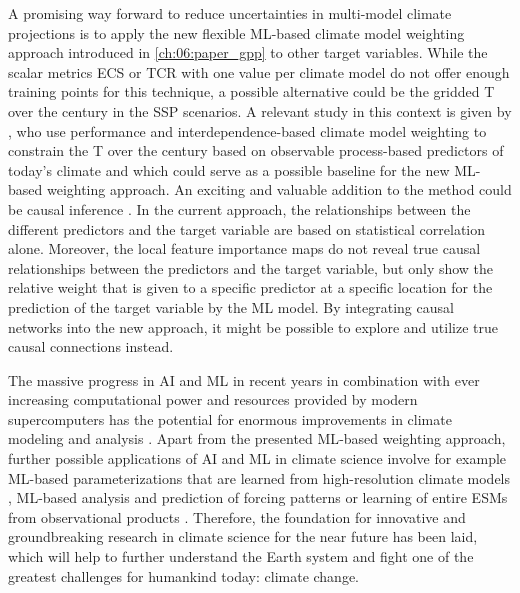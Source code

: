 A promising way forward to reduce uncertainties in multi-model climate
projections is to apply the new flexible \ac{ML}-based climate model weighting
approach introduced in \cref{ch:06:paper_gpp} to other target variables. While
the scalar metrics \ac{ECS} or \ac{TCR} with one value per climate model do not
offer enough training points for this technique, a possible alternative could
be the gridded \acl{T} over the  century in the \ac{SSP} scenarios. A
relevant study in this context is given by \textcite{Brunner2020}, who use
performance and interdependence-based climate model weighting to constrain the
\acl{T} over the  century based on observable process-based predictors
of today's climate and which could serve as a possible baseline for the new
\ac{ML}-based weighting approach. An exciting and valuable addition to the
method could be causal inference \autocite{Nowack2020, Runge2019}. In the
current approach, the relationships between the different predictors and the
target variable are based on statistical correlation alone. Moreover, the local
feature importance maps do not reveal true causal relationships between the
predictors and the target variable, but only show the relative weight that is
given to a specific predictor at a specific location for the prediction of the
target variable by the \ac{ML} model. By integrating causal networks into the
new approach, it might be possible to explore and utilize true causal
connections instead.

The massive progress in \ac{AI} and \ac{ML} in recent years in combination with
ever increasing computational power and resources provided by modern
supercomputers has the potential for enormous improvements in climate modeling
and analysis \autocite{Reichstein2019}. Apart from the presented \ac{ML}-based
weighting approach, further possible applications of \ac{AI} and \ac{ML} in
climate science involve for example \ac{ML}-based parameterizations that are
learned from high-resolution climate models \autocite{Gentine2018, Rasp2018},
\ac{ML}-based analysis and prediction of forcing patterns \autocite{Barnes2019,
  Mansfield2020} or learning of entire \acp{ESM} from observational products
\autocite{Geer2021}. Therefore, the foundation for innovative and
groundbreaking research in climate science for the near future has been laid,
which will help to further understand the Earth system and fight one of the
greatest challenges for humankind today: climate change.
